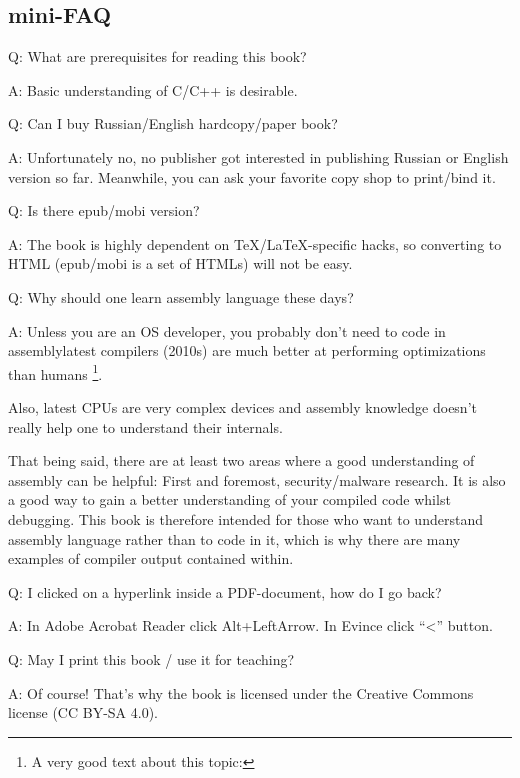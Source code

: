 \subsection*{mini-FAQ}

\par Q: What are prerequisites for reading this book?
\par A: Basic understanding of C/C++ is desirable.

\par Q: Can I buy Russian/English hardcopy/paper book?
\par A: Unfortunately no, no publisher got interested in publishing Russian or English version so far.
Meanwhile, you can ask your favorite copy shop to print/bind it.

\par Q: Is there epub/mobi version?
\par A: The book is highly dependent on TeX/LaTeX-specific hacks, so converting to HTML (epub/mobi is a set of HTMLs)
will not be easy.

\par Q: Why should one learn assembly language these days?
\par A: Unless you are an \ac{OS} developer, you probably don't need to code in assembly\textemdash{}latest compilers (2010s) are much better at performing optimizations than humans \footnote{A very good text about this topic: \InSqBrackets{\AgnerFog}}.

Also, latest \ac{CPU}s are very complex devices and assembly knowledge doesn't really help one to understand their internals.

That being said, there are at least two areas where a good understanding of assembly can be helpful: 
First and foremost, security/malware research. It is also a good way to gain a better understanding of your compiled code whilst debugging.
This book is therefore intended for those who want to understand assembly language rather 
than to code in it, which is why there are many examples of compiler output contained within.

\par Q: I clicked on a hyperlink inside a PDF-document, how do I go back?
\par A: In Adobe Acrobat Reader click Alt+LeftArrow. In Evince click ``<'' button.

\par Q: May I print this book / use it for teaching?
\par A: Of course! That's why the book is licensed under the Creative Commons license (CC BY-SA 4.0).

